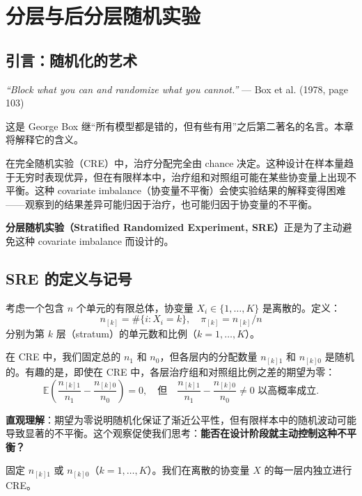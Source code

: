 
\chapter{分层与后分层随机实验}\label{ch:5}

\section{引言：随机化的艺术}\label{sec:5-intro}

\textit{``Block what you can and randomize what you cannot.''}
--- Box et al. (1978, page 103)

这是 George Box 继``所有模型都是错的，但有些有用''之后第二著名的名言。本章将解释它的含义。

在完全随机实验（CRE）中，治疗分配完全由 chance 决定。这种设计在样本量趋于无穷时表现优异，但在有限样本中，治疗组和对照组可能在某些协变量上出现不平衡。这种 covariate imbalance（协变量不平衡）会使实验结果的解释变得困难——观察到的结果差异可能归因于治疗，也可能归因于协变量的不平衡。

\textbf{分层随机实验（Stratified Randomized Experiment, SRE）}正是为了主动避免这种 covariate imbalance 而设计的。

\section{SRE 的定义与记号}\label{sec:5-sre-definition}

考虑一个包含 $n$ 个单元的有限总体，协变量 $X_i \in \{1, \dots, K\}$ 是离散的。定义：
\[
n_{[k]} = \#\{i: X_i = k\}, \quad \pi_{[k]} = n_{[k]} / n
\]
分别为第 $k$ 层（stratum）的单元数和比例（$k = 1, \dots, K$）。

在 CRE 中，我们固定总的 $n_1$ 和 $n_0$，但各层内的分配数量 $n_{[k]1}$ 和 $n_{[k]0}$ 是随机的。有趣的是，即使在 CRE 中，各层治疗组和对照组比例之差的期望为零：
\[
\mathbb{E}\left( \frac{n_{[k]1}}{n_1} - \frac{n_{[k]0}}{n_0} \right) = 0,
\quad \text{但} \quad
\frac{n_{[k]1}}{n_1} - \frac{n_{[k]0}}{n_0} \neq 0 \text{ 以高概率成立}.
\label{eq:5-2-balance}
\tag{5.2}
\]

\textbf{直观理解}：期望为零说明随机化保证了渐近公平性，但有限样本中的随机波动可能导致显著的不平衡。这个观察促使我们思考：\textbf{能否在设计阶段就主动控制这种不平衡？}

\begin{Definition}\label{def:5-1}
固定 $n_{[k]1}$ 或 $n_{[k]0}$（$k = 1, \dots, K$）。我们在离散的协变量 $X$ 的每一层内独立进行 CRE。
\end{Definition}


